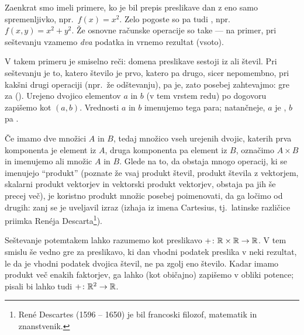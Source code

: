 

Zaenkrat smo imeli primere, ko je bil prepis preslikave dan z eno samo spremenljivko, npr.~$f(x) = x^2$. Zelo pogoste so pa tudi , npr.~$f(x, y) = x^2 + y^2$. Že osnovne računske operacije so take --- na primer, pri seštevanju vzamemo \emph{dva} podatka in vrnemo rezultat (vsoto).

V takem primeru je smiselno reči: domena preslikave sestoji iz  ali  števil. Pri seštevanju je to, katero število je prvo, katero pa drugo, sicer nepomembno, pri kakšni drugi operaciji (npr.~že odštevanju), pa je, zato posebej zahtevajmo: gre za  (). Urejeno dvojico elementov $a$ in $b$ (v tem vrstem redu) po dogovoru zapišemo kot $(a, b)$. Vrednosti $a$ in $b$ imenujemo  tega para; natančneje, $a$ je , $b$ pa .

Če imamo dve množici $A$ in $B$, tedaj množico vseh urejenih dvojic, katerih prva komponenta je element iz $A$, druga komponenta pa element iz $B$, označimo $A \times B$ in imenujemo  ali  množic $A$ in $B$. Glede na to, da obstaja mnogo operacij, ki se imenujejo ``produkt'' (poznate že vsaj produkt števil, produkt števila z vektorjem, skalarni produkt vektorjev in vektorski produkt vektorjev, obstaja pa jih še precej več), je koristno produkt množic posebej poimenovati, da ga ločimo od drugih: zanj se je uveljavil izraz  (izhaja iz imena Cartesius, tj.~latinske različice priimka Renéja Descarta\footnote{René Descartes (1596 -- 1650) je bil francoski filozof, matematik in znanstvenik.}).

Seštevanje potemtakem lahko razumemo kot preslikavo $+\colon \mathbb{R} \times \mathbb{R} \to \mathbb{R}$. V tem smislu še vedno gre za preslikavo, ki dan vhodni podatek preslika v neki rezultat, le da je vhodni podatek dvojica števil, ne pa zgolj eno število. Kadar imamo produkt več enakih faktorjev, ga lahko (kot običajno) zapišemo v obliki potence; pisali bi lahko tudi $+\colon \mathbb{R}^2 \to \mathbb{R}$.

